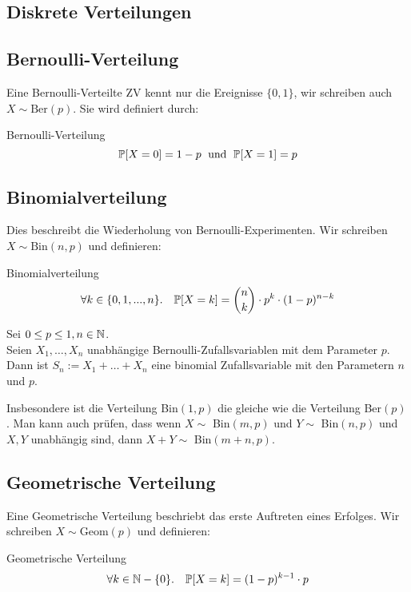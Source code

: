 \subsection{Diskrete Verteilungen}

\subsection*{Bernoulli-Verteilung} 
Eine Bernoulli-Verteilte ZV kennt nur die Ereignisse $\{0,1\}$, wir schreiben auch $X \sim \text{Ber}(p)$. Sie wird definiert durch: 
\begin{mainbox}{Bernoulli-Verteilung}
    $$\mathbb{P}[X = 0] = 1 - p \; \text{ und } \; \mathbb{P}[X = 1] = p$$
\end{mainbox}

\subsection*{Binomialverteilung}
 Dies beschreibt die Wiederholung von Bernoulli-Experimenten. Wir schreiben $X \sim \text{Bin}(n,p)$ und definieren:

 \begin{mainbox}{Binomialverteilung}
    $$\forall k \in \{0, 1, ..., n\}. \quad \mathbb{P}[X = k] = \binom{n}{k} \cdot p^k \cdot (1-p)^{n-k}$$
 \end{mainbox}

 \begin{subbox}{}
    Sei $0 \leq p \leq 1, n \in \mathbb{N}$. \\
    Seien $X_1, \ldots , X_n$ unabhängige Bernoulli-Zufallsvariablen mit dem Parameter $p$. \\ Dann
    ist $S_n := X_1 + \ldots + X_n$
    eine binomial Zufallsvariable mit den Parametern $n$ und $p$.
\end{subbox}

Insbesondere ist die Verteilung Bin$(1, p)$ die gleiche wie die Verteilung Ber$(p)$. Man kann auch prüfen, dass wenn $X \sim$ Bin$(m, p)$ und $Y \sim$ Bin$(n, p)$ und $X, Y$ unabhängig sind, dann $X + Y \sim$ Bin$(m + n, p)$.

\subsection*{Geometrische Verteilung} Eine Geometrische Verteilung beschriebt das erste Auftreten eines Erfolges. Wir schreiben $X \sim \text{Geom}(p)$ und definieren:

\begin{mainbox}{Geometrische Verteilung}
    $$\forall k \in \mathbb{N} - \{0\}. \quad \mathbb{P}[X = k] = (1-p)^{k-1} \cdot p$$
\end{mainbox}

